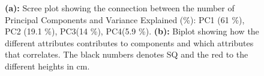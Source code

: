 \begin{figure}[!t]
\centering
{}
\hfil
{}
\caption{\textbf{(a):} Scree plot showing the connection between the number of Principal Components and Variance Explained (\%): PC1 (61 \%), PC2 (19.1 \%), PC3(14 \%), PC4(5.9 \%). \textbf{(b):} Biplot showing how the different attributes contributes to components and which attributes that correlates. The black numbers denotes SQ and the red to the different heights in cm.}
\label{fig_sim}
\end{figure}
